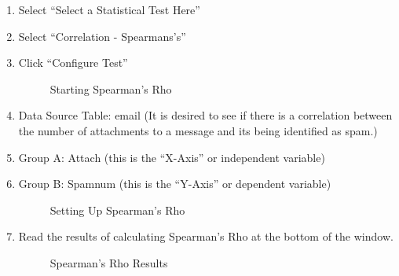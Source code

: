 \begin{enumerate}
  \item Select ``Select a Statistical Test Here''
  \item Select ``Correlation - Spearmans's''
  \item Click ``Configure Test''
  
  \begin{figure}[H]
    \begin{center}
      \caption{Starting Spearman's Rho}
    \end{center}
  \end{figure}
  
  \item Data Source Table: email (It is desired to see if there is a correlation between the number of attachments to a message and its being identified as spam.)
  \item Group A: Attach (this is the ``X-Axis'' or independent variable)
  \item Group B: Spamnum (this is the ``Y-Axis'' or dependent variable)

  \begin{figure}[H]
  \begin{center}
    \caption{Setting Up Spearman's Rho}
  \end{center}
  \end{figure}
  
  \item Read the results of calculating Spearman's Rho at the bottom of the window.

  \begin{figure}[H]
    \begin{center}
      \caption{Spearman's Rho Results}
    \end{center}
  \end{figure}


\end{enumerate}
